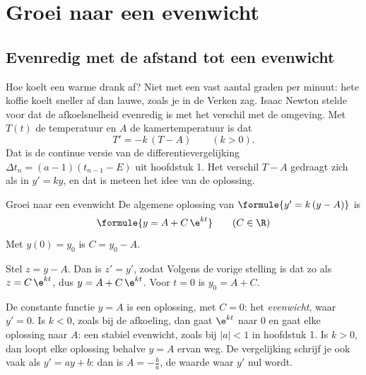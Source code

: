 \section{Groei naar een evenwicht}

\subsection{Evenredig met de afstand tot een evenwicht}

Hoe koelt een warme drank af? Niet met een vast aantal graden per minuut: hete koffie koelt sneller af dan lauwe, zoals je in de Verken zag. Isaac Newton stelde voor dat de afkoelsnelheid evenredig is met het verschil met de omgeving. Met $T(t)$ de temperatuur en $A$ de kamertemperatuur is dat
\[
T' = -k\,(T - A) \qquad (k > 0) .
\]
Dat is de continue versie van de differentievergelijking $\Delta t_n = (a - 1)(t_{n-1} - E)$ uit hoofdstuk 1. Het verschil $T - A$ gedraagt zich als in $y' = ky$, en dat is meteen het idee van de oplossing.

\begin{theorie}
\begin{stelling}{Groei naar een evenwicht}
De algemene oplossing van $\formule{y' = k\,(y - A)}$ is
\[
\formule{y = A + C\,\e^{kt}} \qquad (C \in \R)
\]
Met $y(0) = y_0$ is $C = y_0 - A$.
\end{stelling}

\begin{bewijs}
Stel $z = y - A$. Dan is $z' = y'$, zodat
Volgens de vorige stelling is dat zo als $z = C\,\e^{kt}$, dus $y = A + C\,\e^{kt}$. Voor $t = 0$ is $y_0 = A + C$.
\end{bewijs}
\end{theorie}

De constante functie $y = A$ is een oplossing, met $C = 0$: het \textit{evenwicht}, waar $y' = 0$. Is $k < 0$, zoals bij de afkoeling, dan gaat $\e^{kt}$ naar 0 en gaat elke oplossing naar $A$: een stabiel evenwicht, zoals bij $|a| < 1$ in hoofdstuk 1. Is $k > 0$, dan loopt elke oplossing behalve $y = A$ ervan weg. De vergelijking schrijf je ook vaak als $y' = ay + b$: dan is $A = -\tfrac{b}{a}$, de waarde waar $y'$ nul wordt.

